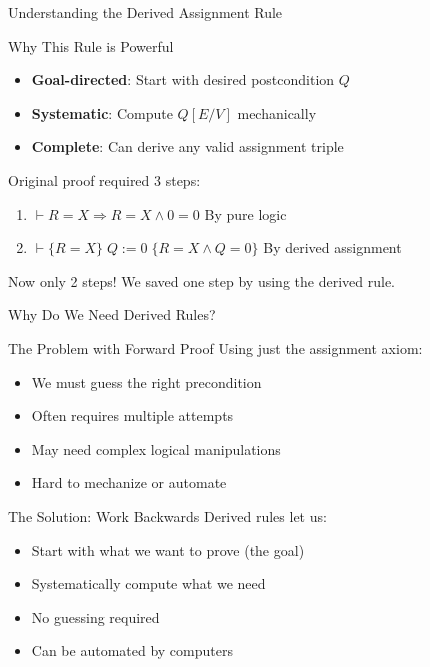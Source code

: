\begin{frame}{Understanding the Derived Assignment Rule}
    \begin{block}{Why This Rule is Powerful}
        \begin{itemize}
            \item \textbf{Goal-directed}: Start with desired postcondition $Q$
            \item \textbf{Systematic}: Compute $Q[E/V]$ mechanically
            \item \textbf{Complete}: Can derive any valid assignment triple
        \end{itemize}
    \end{block}
    
    \begin{example}
        Original proof required 3 steps:
        \begin{enumerate}
            \item $\vdash R=X \Rightarrow R=X \wedge 0=0$ \hfill By pure logic
            \item $\vdash \{R=X\} \; Q:=0 \; \{R=X \wedge Q=0\}$ \hfill By derived assignment
        \end{enumerate}
        Now only 2 steps! We saved one step by using the derived rule.
    \end{example}
\end{frame}

\begin{frame}{Why Do We Need Derived Rules?}
    \begin{block}{The Problem with Forward Proof}
        Using just the assignment axiom:
        \begin{itemize}
            \item We must guess the right precondition
            \item Often requires multiple attempts
            \item May need complex logical manipulations
            \item Hard to mechanize or automate
        \end{itemize}
    \end{block}
    
    \begin{block}{The Solution: Work Backwards}
        Derived rules let us:
        \begin{itemize}
            \item Start with what we want to prove (the goal)
            \item Systematically compute what we need
            \item No guessing required
            \item Can be automated by computers
        \end{itemize}
    \end{block}
\end{frame}

